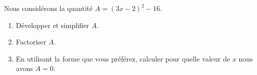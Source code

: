 
\begin{exercice}\label{exosmath-0370}

Nous considérons la quantité \( A=(3x-2)^2-16\).
\begin{enumerate}
    \item
        Développer et simplifier \( A\).
    \item
        Factoriser \( A\).
    \item
        En utilisant la forme que vous préférez, calculer pour quelle valeur de \( x\) nous avons \( A=0\).
\end{enumerate}

\end{exercice}
